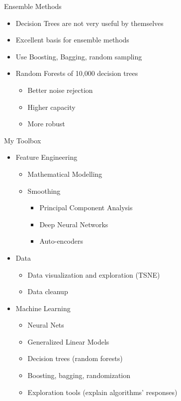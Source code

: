 \documentclass{beamer}
\begin{document}
\begin{frame}{Ensemble Methods}
  \begin{itemize}
  \item Decision Trees are not very useful by themselves
  \item Excellent basis for \alert{ensemble methods}
  \item Use Boosting, Bagging, random sampling
  \item Random Forests of 10,000 decision trees
    \begin{itemize}
    \item Better noise rejection
    \item Higher capacity
    \item More robust
    \end{itemize}
  \end{itemize}
\end{frame}

\begin{frame}{My Toolbox}

  \begin{itemize}
  \item Feature Engineering
    \begin{itemize}
    \item Mathematical Modelling
    \item Smoothing
      \begin{itemize}
        \item Principal Component Analysis
        \item Deep Neural Networks
        \item Auto-encoders
      \end{itemize}
    \end{itemize}
  \item Data
    \begin{itemize}
    \item Data visualization and exploration (TSNE)
    \item Data cleanup
    \end{itemize}
  \item Machine Learning
    \begin{itemize}
    \item Neural Nets
    \item Generalized Linear Models
    \item Decision trees (random forests)
    \item Boosting, bagging, randomization
    \item Exploration tools (explain algorithms' responses)
    \end{itemize}
  \end{itemize}
\end{frame}
\end{document}

